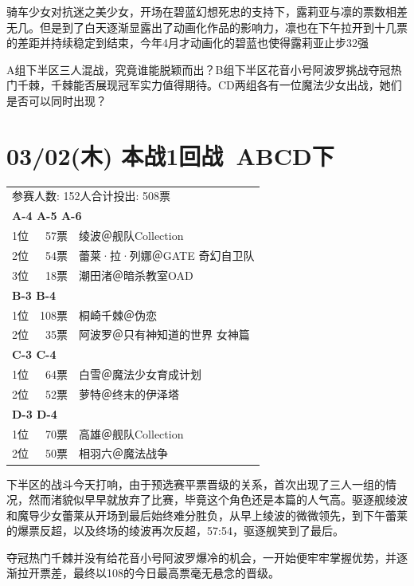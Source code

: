 
骑车少女对抗迷之美少女，开场在碧蓝幻想死忠的支持下，露莉亚与凛的票数相差无几。但是到了白天逐渐显露出了动画化作品的影响力，凛也在下午拉开到十几票的差距并持续稳定到结束，今年4月才动画化的碧蓝也使得露莉亚止步32强

A组下半区三人混战，究竟谁能脱颖而出？B组下半区花音小号阿波罗挑战夺冠热门千棘，千棘能否展现冠军实力值得期待。CD两组各有一位魔法少女出战，她们是否可以同时出现？


\section{03/02(木) 本战1回战~ABCD下}

{\kai\begin{longtable}{rrl}
\multicolumn{3}{l}{参赛人数: 152人\quad 合计投出: 508票} \\
\multicolumn{3}{l}{\bfseries A-4 A-5 A-6 } \\
1位 & 57票 & 绫波＠舰队Collection \\
2位 & 54票 & 蕾莱·拉·列娜＠GATE 奇幻自卫队 \\
3位 & 18票 & 潮田渚＠暗杀教室OAD \\
\multicolumn{3}{l}{\bfseries B-3 B-4 } \\
1位 & 108票 & 桐崎千棘＠伪恋 \\
2位 & 35票 & 阿波罗＠只有神知道的世界 女神篇 \\
\multicolumn{3}{l}{\bfseries C-3 C-4 } \\
1位 & 64票 & 白雪＠魔法少女育成计划 \\
2位 & 52票 & 萝特＠终末的伊泽塔 \\
\multicolumn{3}{l}{\bfseries D-3 D-4 } \\
1位 & 70票 & 高雄＠舰队Collection \\
2位 & 50票 & 相羽六＠魔法战争 \\
\end{longtable}}


下半区的战斗今天打响，由于预选赛平票晋级的关系，首次出现了三人一组的情况，然而渚貌似早早就放弃了比赛，毕竟这个角色还是本篇的人气高。驱逐舰绫波和魔导少女蕾莱从开场到最后始终难分胜负，从早上绫波的微微领先，到下午蕾莱的爆票反超，以及终场的绫波再次反超，57:54，驱逐舰笑到了最后。


夺冠热门千棘并没有给花音小号阿波罗爆冷的机会，一开始便牢牢掌握优势，并逐渐拉开票差，最终以108的今日最高票毫无悬念的晋级。

